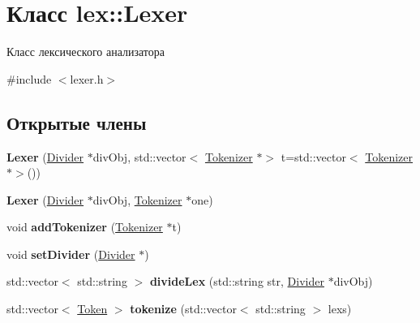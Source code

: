 \hypertarget{classlex_1_1_lexer}{}\section{Класс lex\+:\+:Lexer}
\label{classlex_1_1_lexer}


Класс лексического анализатора  




{\ttfamily \#include $<$lexer.\+h$>$}

\subsection*{Открытые члены}
\begin{DoxyCompactItemize}
\item 
\mbox{\label{classlex_1_1_lexer_a4c3c63439f64bf232e8995aaa555a7e4}} 
{\bfseries Lexer} (\hyperlink{classlex_1_1_divider}{Divider} $\ast$div\+Obj, std\+::vector$<$ \hyperlink{classlex_1_1_tokenizer}{Tokenizer} $\ast$$>$ t=std\+::vector$<$ \hyperlink{classlex_1_1_tokenizer}{Tokenizer} $\ast$$>$())
\item 
\mbox{\label{classlex_1_1_lexer_a64c1af615d7d401c0e6fcbf0c0c8e02b}} 
{\bfseries Lexer} (\hyperlink{classlex_1_1_divider}{Divider} $\ast$div\+Obj, \hyperlink{classlex_1_1_tokenizer}{Tokenizer} $\ast$one)
\item 
\mbox{\label{classlex_1_1_lexer_a950c6154df77c2be981ae428d901eb48}} 
void {\bfseries add\+Tokenizer} (\hyperlink{classlex_1_1_tokenizer}{Tokenizer} $\ast$t)
\item 
\mbox{\label{classlex_1_1_lexer_aeb57d492b39419657a5f167317e7bc34}} 
void {\bfseries set\+Divider} (\hyperlink{classlex_1_1_divider}{Divider} $\ast$)
\item 
\mbox{\label{classlex_1_1_lexer_a95cfd8a79f29edc132fb9cd66f3a0fe9}} 
std\+::vector$<$ std\+::string $>$ {\bfseries divide\+Lex} (std\+::string str, \hyperlink{classlex_1_1_divider}{Divider} $\ast$div\+Obj)
\item 
\mbox{\label{classlex_1_1_lexer_a4ba2959182553e6ef14ec9f4ec717289}} 
std\+::vector$<$ \hyperlink{classlex_1_1_token}{Token} $>$ {\bfseries tokenize} (std\+::vector$<$ std\+::string $>$ lexs)
\end{DoxyCompactItemize}



